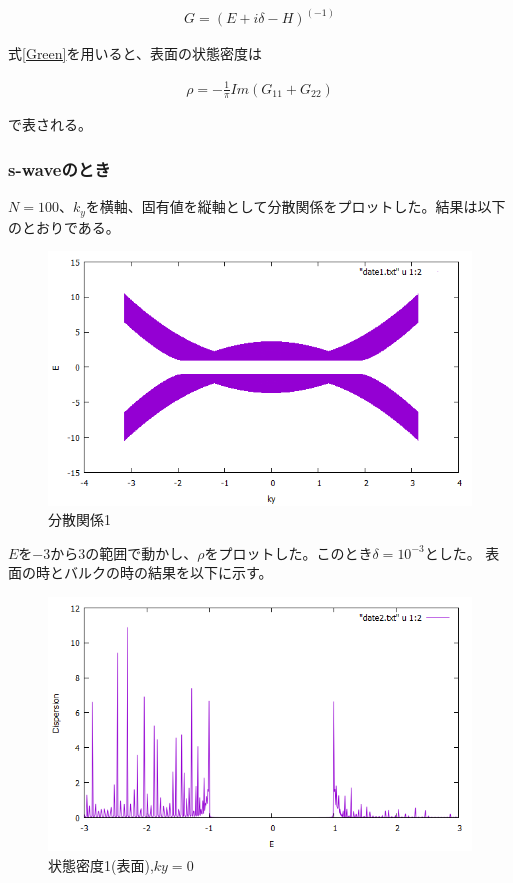 \documentclass{jsarticle}
\begin{document}
            \begin{align}
                G=(E+i\delta-H)^(-1)
                \label{Green}
            \end{align}

            式\eqref{Green}を用いると、表面の状態密度は
    
            \begin{align}
                \rho=-\frac{1}{\pi}Im(G_{11}+G_{22})
            \end{align}
    
            で表される。

            \subsubsection{s-waveのとき}
            $N=100$、$k_y$を横軸、固有値を縦軸として分散関係をプロットした。結果は以下のとおりである。
    
            \begin{figure}[H]
                \centering
                \includegraphics[scale=0.5]{BdG_bry.png}
                \caption{分散関係1}
                \label{Dispersion1}
            \end{figure}
    
            $E$を$-3$から$3$の範囲で動かし、$\rho$をプロットした。このとき$\delta=10^{-3}$とした。
            表面の時とバルクの時の結果を以下に示す。
    
            \begin{figure}[H]
                \centering
                \includegraphics[scale=0.5]{LDOS_bry.png}
                \caption{状態密度1(表面),$ky=0$}
                \label{LDOS1}
            \end{figure}
\end{document}
